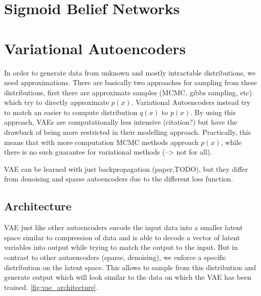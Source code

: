 \documentclass[twoside,11pt,a4paper]{article}
\theoremstyle{break}
\begin{document}
\section{Sigmoid Belief Networks}
\label{sec:sbn}


\section{Variational Autoencoders}
\label{sec:vae}

In order to generate data from unknown and mostly intractable distributions, we need approximations.
There are basically two approaches for sampling from these distributions,
first there are approximate samples (MCMC, gibbs sampling, etc) which try to directly approximate $p(x)$.
Variational Autoencoders instead try to match an easier to compute distribution $q(x)$ to $p(x)$.
By using this approach, VAEs are computationally less intensive (citation?) but have the drawback of being more restricted in their modelling approach.
Practically, this means that with more computation MCMC methods approach $p(x)$, while there is no such guarantee for variational methods (--> not for all).

VAE can be learned with just backpropagation (paper,TODO), but they differ from denoising and sparse autoencoders due to the different loss function.



\subsection{Architecture}
\label{sub:vae_architecture}
VAE just like other autoencoders encode the input data into a smaller latent space similar to compression of data and is able to decode a vector of latent variables into output while trying to match the output to the input.
But in contrast to other autoencoders (sparse, denoising), we enforce a specific distribution on the latent space.
This allows to sample from this distribution and generate output which will look similar to the data on which the VAE has been trained.
\ref{fig:vae_architecture}.
\end{document}
